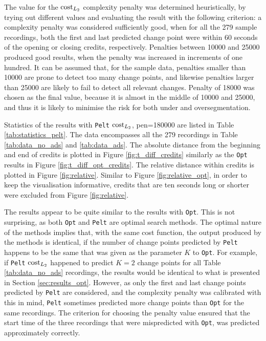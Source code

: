 The value for the $\operatorname{cost}_{L_2}$ complexity penalty was determined heuristically, by trying out different values and evaluating the result with the following criterion: a complexity penalty was considered sufficiently good, when for all the 279 sample recordings, both the first and last predicted change point were within 60 seconds of the opening or closing credits, respectively. Penalties between 10000 and 25000 produced good results, when the penalty was increased in increments of one hundred. It can be assumed that, for the sample data, penalties smaller than 10000 are prone to detect too many change points, and likewise penalties larger than 25000 are likely to fail to detect all relevant changes. Penalty of 18000 was chosen as the final value, because it is almost in the middle of 10000 and 25000, and thus it is likely to minimise the risk for both under and oversegmentation.

Statistics of the results with \texttt{Pelt} $\operatorname{cost}_{L_2}$, pen=180000 are listed in Table \ref{tab:statistics_pelt}. The data encompasses all the 279 recordings in Table \ref{tab:data_no_ads} and \ref{tab:data_ads}. The absolute distance from the beginning and end of credits is plotted in Figure \ref{fig:t_diff_credits} similarly as the \texttt{Opt} results in Figure \ref{fig:t_diff_opt_credits}. The relative distance within credits is plotted in Figure \ref{fig:relative}. Similar to Figure \ref{fig:relative_opt}, in order to keep the visualisation informative, credits that are ten seconds long or shorter were excluded from Figure \ref{fig:relative}.

The results appear to be quite similar to the results with \texttt{Opt}. This is not surprising, as both \texttt{Opt} and \texttt{Pelt} are optimal search methods. The optimal nature of the methods implies that, with the same cost function, the output produced by the methods is identical, if the number of change points predicted by \texttt{Pelt} happens to be the same that was given as the parameter $K$ to \texttt{Opt}. For example, if \texttt{Pelt} $\operatorname{cost}_{L_2}$ happened to predict $K=2$ change points for all Table \ref{tab:data_no_ads} recordings, the results would be identical to what is presented in Section \ref{sec:results_opt}. However, as only the first and last change points predicted by \texttt{Pelt} are considered, and the complexity penalty was calibrated with this in mind, \texttt{Pelt} sometimes predicted more change points than \texttt{Opt} for the same recordings. The criterion for choosing the penalty value ensured that the start time of the three recordings that were mispredicted with \texttt{Opt}, was predicted approximately correctly.


